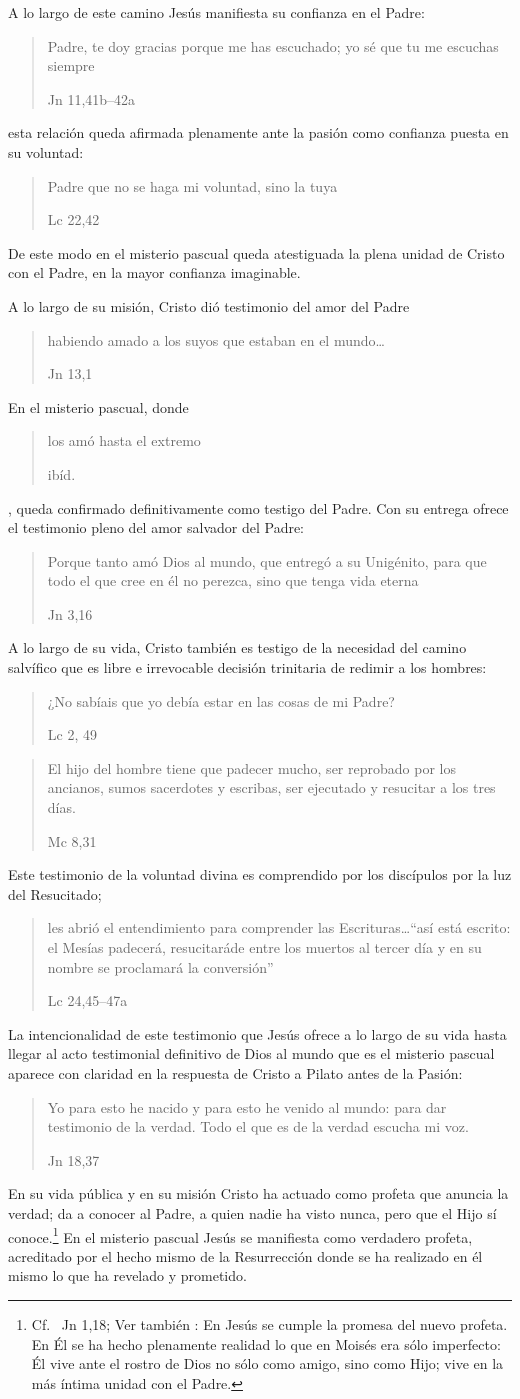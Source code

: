 A lo largo de este camino Jesús manifiesta su confianza en el Padre:
\blockquote[Jn 11,41b--42a]{Padre, te doy gracias porque me has escuchado; yo sé
  que tu me escuchas siempre}; esta relación queda afirmada plenamente ante la
pasión como confianza puesta en su voluntad: \blockquote[Lc 22,42]{Padre
  \textelp{} que no se haga mi voluntad, sino la tuya}. De este modo en el
misterio pascual queda atestiguada la plena unidad de Cristo con el Padre, en la
mayor confianza imaginable.\autocite[Cf.~][127]{prades2015testimonio}

A lo largo de su misión, Cristo dió testimonio del amor del Padre \blockquote[Jn
13,1]{habiendo amado a los suyos que estaban en el mundo\ldots}. En el misterio
pascual, donde \blockquote[ibíd.]{los amó hasta el extremo}, queda confirmado
definitivamente como testigo del Padre. Con su entrega ofrece el testimonio
pleno del amor salvador del Padre: \blockquote[Jn 3,16]{Porque tanto amó Dios al
  mundo, que entregó a su Unigénito, para que todo el que cree en él no perezca,
  sino que tenga vida eterna}.

A lo largo de su vida, Cristo también es testigo de la necesidad del camino
salvífico que es libre e irrevocable decisión trinitaria de redimir a los
hombres\autocite[Cf.~][128]{prades2015testimonio}: \blockquote[Lc 2, 49]{¿No
  sabíais que yo debía estar en las cosas de mi Padre?}; \blockquote[Mc 8,31]{El
  hijo del hombre tiene que padecer mucho, ser reprobado por los ancianos, sumos
  sacerdotes y escribas, ser ejecutado y resucitar a los tres días.} Este
testimonio de la voluntad divina es comprendido por los discípulos por la luz
del Resucitado; \blockquote[Lc 24,45--47a]{les abrió el entendimiento para
  comprender las Escrituras\ldots \enquote{así está escrito: el Mesías padecerá,
    resucitaráde entre los muertos al tercer día y en su nombre se proclamará la
    conversión}}.

La intencionalidad de este testimonio que Jesús ofrece a lo largo de su vida
hasta llegar al acto testimonial definitivo de Dios al mundo que es el misterio
pascual aparece con claridad en la respuesta de Cristo a Pilato antes de la
Pasión: \blockquote[Jn 18,37]{Yo para esto he nacido y para esto he venido al
  mundo: para dar testimonio de la verdad. Todo el que es de la verdad escucha
  mi voz.} En su vida pública y en su misión Cristo ha actuado como profeta que
anuncia la verdad; da a conocer al Padre, a quien nadie ha visto nunca, pero que
el Hijo sí conoce.\footnote{Cf.~ Jn 1,18; Ver también
  \cite[28]{ratzinger2007jdenaz}: En Jesús se cumple la promesa del nuevo
  profeta. En Él se ha hecho plenamente realidad lo que en Moisés era sólo
  imperfecto: Él vive ante el rostro de Dios no sólo como amigo, sino como Hijo;
  vive en la más íntima unidad con el Padre.} En el misterio pascual Jesús se
manifiesta como verdadero profeta, acreditado por el hecho mismo de la
Resurrección donde se ha realizado en él mismo lo que ha revelado y
prometido.\autocite[128]{prades2015testimonio}


